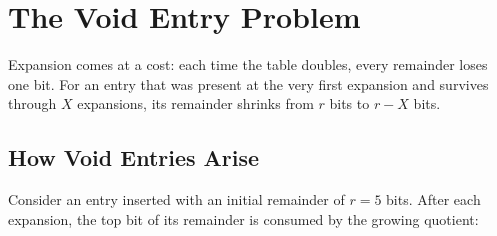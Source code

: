 \section{The Void Entry Problem}

Expansion comes at a cost: each time the table doubles, every remainder 
loses one bit. For an entry that was present at the very first expansion 
and survives through $X$ expansions, its remainder shrinks from $r$ bits 
to $r - X$ bits.

\subsection{How Void Entries Arise}

Consider an entry inserted with an initial remainder of $r = 5$ bits. 
After each expansion, the top bit of its remainder is consumed by the 
growing quotient:

